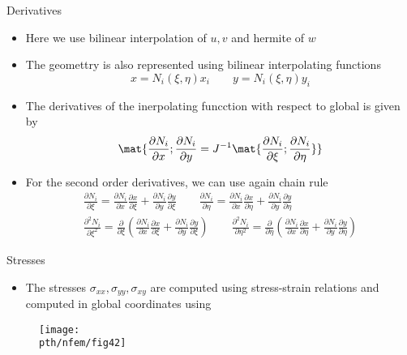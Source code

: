 	\begin{frame}{Derivatives}
		\begin{itemize}
			\item Here we use bilinear interpolation of $u,v$ and hermite of $w$
			\item The geomettry is also represented using bilinear interpolating functions
			\begin{equation}
				x = N_i(\xi,\eta)x_i \qquad y = N_i(\xi,\eta) y_i
			\end{equation}
			\item The derivatives of the inerpolating funcction with respect to global is given by
			\begin{equation}
				\mat{\frac{\partial N_i}{\partial x}; \frac{\partial N_i}{\partial y} = J^{-1} 
					\mat{\frac{\partial N_i}{\partial \xi}; \frac{\partial N_i}{\partial \eta}}}
			\end{equation}
			\item For the second order derivatives, we can use again chain rule
			\begin{equation}
			\begin{aligned}
				\frac{\partial N_i}{\partial \xi} = \frac{\partial N_i}{\partial x}\frac{\partial  x}{\partial \xi} + \frac{\partial N_i}{\partial y}\frac{\partial  y}{\partial \xi}
				\qquad
				\frac{\partial N_i}{\partial \eta} = \frac{\partial N_i}{\partial x}\frac{\partial  x}{\partial \eta} + \frac{\partial N_i}{\partial y}\frac{\partial  y}{\partial \eta} \\
				\frac{\partial^2 N_i}{\partial \xi^2} = \frac{\partial }{\partial \xi}\left(\frac{\partial N_i}{\partial x}\frac{\partial  x}{\partial \xi} + \frac{\partial N_i}{\partial y}\frac{\partial  y}{\partial \xi} \right)		\qquad
				\frac{\partial^2 N_i}{\partial \eta^2} = \frac{\partial }{\partial \eta}\left(\frac{\partial N_i}{\partial x}\frac{\partial  x}{\partial \eta} + \frac{\partial N_i}{\partial y}\frac{\partial  y}{\partial \eta} \right)		  
			\end{aligned}
			\end{equation}
		\end{itemize}
	\end{frame}


	\begin{frame}{Stresses}
		\begin{itemize}
			\item The stresses $\sigma_{xx},\sigma_{yy},\sigma_{xy}$ are computed using stress-strain relations and computed in global coordinates using 		
		\end{itemize}
		\begin{figure}
			\centering
			\texttt{[image: \\pth/nfem/fig42]}  		
		\end{figure}
	\end{frame}

